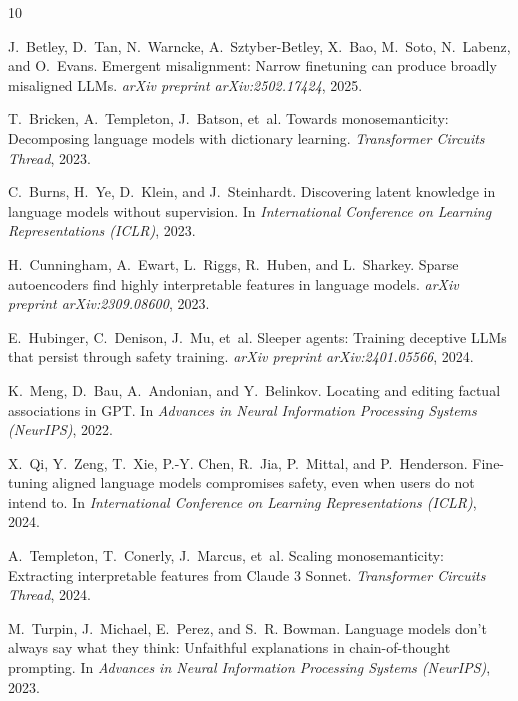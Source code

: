 \documentclass[11pt]{article}
\begin{document}

\begin{thebibliography}{10}

J.~Betley, D.~Tan, N.~Warncke, A.~Sztyber-Betley, X.~Bao, M.~Soto, N.~Labenz, and O.~Evans.
\newblock Emergent misalignment: Narrow finetuning can produce broadly misaligned LLMs.
\newblock \emph{arXiv preprint arXiv:2502.17424}, 2025.

T.~Bricken, A.~Templeton, J.~Batson, et~al.
\newblock Towards monosemanticity: Decomposing language models with dictionary learning.
\newblock \emph{Transformer Circuits Thread}, 2023.

C.~Burns, H.~Ye, D.~Klein, and J.~Steinhardt.
\newblock Discovering latent knowledge in language models without supervision.
\newblock In \emph{International Conference on Learning Representations (ICLR)}, 2023.

H.~Cunningham, A.~Ewart, L.~Riggs, R.~Huben, and L.~Sharkey.
\newblock Sparse autoencoders find highly interpretable features in language models.
\newblock \emph{arXiv preprint arXiv:2309.08600}, 2023.

E.~Hubinger, C.~Denison, J.~Mu, et~al.
\newblock Sleeper agents: Training deceptive LLMs that persist through safety training.
\newblock \emph{arXiv preprint arXiv:2401.05566}, 2024.

K.~Meng, D.~Bau, A.~Andonian, and Y.~Belinkov.
\newblock Locating and editing factual associations in GPT.
\newblock In \emph{Advances in Neural Information Processing Systems (NeurIPS)}, 2022.

X.~Qi, Y.~Zeng, T.~Xie, P.-Y. Chen, R.~Jia, P.~Mittal, and P.~Henderson.
\newblock Fine-tuning aligned language models compromises safety, even when users do not intend to.
\newblock In \emph{International Conference on Learning Representations (ICLR)}, 2024.

A.~Templeton, T.~Conerly, J.~Marcus, et~al.
\newblock Scaling monosemanticity: Extracting interpretable features from Claude 3 Sonnet.
\newblock \emph{Transformer Circuits Thread}, 2024.

M.~Turpin, J.~Michael, E.~Perez, and S.~R. Bowman.
\newblock Language models don't always say what they think: Unfaithful explanations in chain-of-thought prompting.
\newblock In \emph{Advances in Neural Information Processing Systems (NeurIPS)}, 2023.


\end{thebibliography}
\end{document}
